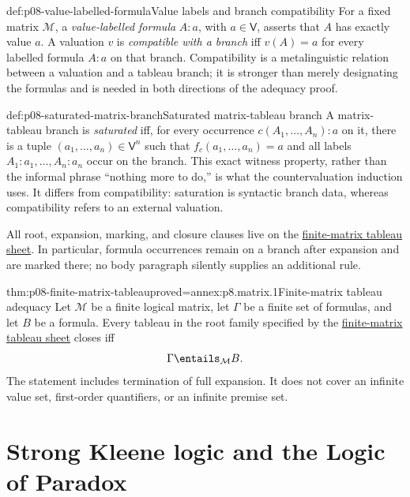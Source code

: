 \begin{hbdefinition}{def:p08-value-labelled-formula}{Value labels and branch compatibility}
For a fixed matrix \(\mathcal M\), a \emph{value-labelled formula}
\(A{:}a\), with \(a\in\mathsf V\), asserts that \(A\) has exactly value
\(a\).  A valuation \(v\) is \emph{compatible with a branch} iff
\(v(A)=a\) for every labelled formula \(A{:}a\) on that branch.  Compatibility
is a metalinguistic relation between a valuation and a tableau branch; it is
stronger than merely designating the formulas and is needed in both directions
of the adequacy proof.
\end{hbdefinition}

\begin{hbdefinition}{def:p08-saturated-matrix-branch}{Saturated matrix-tableau branch}
A matrix-tableau branch is \emph{saturated} iff, for every occurrence
\(c(A_1,\ldots,A_n){:}a\) on it, there is a tuple
\((a_1,\ldots,a_n)\in\mathsf V^n\) such that
\(f_c(a_1,\ldots,a_n)=a\) and all labels
\(A_1{:}a_1,\ldots,A_n{:}a_n\) occur on the branch.  This exact witness
property, rather than the informal phrase ``nothing more to do,'' is what the
countervaluation induction uses.  It differs from compatibility: saturation
is syntactic branch data, whereas compatibility refers to an external
valuation.
\end{hbdefinition}

All root, expansion, marking, and closure clauses live on the
\hyperref[sheet:tableaux-matrix]{finite-matrix tableau sheet}.  In
particular, formula occurrences remain on a branch after expansion and are
marked there; no body paragraph silently supplies an additional rule.

\begin{hbtheorem}{thm:p08-finite-matrix-tableau}{proved=annex:p8.matrix.1}{Finite-matrix tableau adequacy}
Let \(\mathcal M\) be a finite logical matrix, let \(\Gamma\) be a finite set
of formulas, and let \(B\) be a formula.  Every tableau in the root family
specified by the \hyperref[sheet:tableaux-matrix]{finite-matrix tableau sheet}
closes iff
\[
  \Gamma\entails_{\mathcal M}B.
\]
The statement includes termination of full expansion.  It does not cover an
infinite value set, first-order quantifiers, or an infinite premise set.
\end{hbtheorem}

\section{Strong Kleene logic and the Logic of Paradox}

